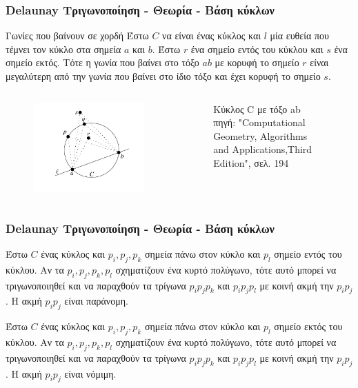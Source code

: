 \documentclass[xcolor=dvipsnames, 11pt]{beamer}
\newcommand{\en}{\selectlanguage{english}}
\newcommand{\el}{\selectlanguage{greek}}
\begin{document}
\begin{frame}
	\frametitle{\en Delaunay \el Τριγωνοποίηση - Θεωρία - Βάση κύκλων}
	\begin{mytheorem}{Γωνίες που βαίνουν σε χορδή}{}
		Έστω \(C\) να είναι ένας κύκλος και \(l\) μία ευθεία που τέμνει τον κύκλο στα σημεία \(a\) και \(b\). Έστω \(r\) ένα σημείο εντός του κύκλου και \(s\) ένα σημείο εκτός. Τότε η γωνία που βαίνει στο τόξο \(ab\) με κορυφή το σημείο \(r\) είναι μεγαλύτερη από την γωνία που βαίνει στο ίδιο τόξο και έχει κορυφή το σημείο \(s\). 
	\end{mytheorem}
	\begin{columns}
		\begin{figure}
			\includegraphics[scale=0.25]{images/circle.png}
		\end{figure}
		\begin{figure}
			\caption{Κύκλος C με τόξο ab \\ πηγή: "Computational Geometry, Algorithms and Applications,Third Edition", σελ. 194}
		\end{figure}
	\end{columns}
\end{frame}

\begin{frame}
	\frametitle{\en Delaunay \el Τριγωνοποίηση - Θεωρία - Βάση κύκλων}
	\begin{mylemma}{}{}
		Έστω \(C\) ένας κύκλος και \(p_i, p_j, p_k\) σημεία πάνω στον κύκλο και \(p_l\) σημείο εντός του κύκλου. Αν τα \(p_i, p_j, p_k, p_l\) σχηματίζουν ένα κυρτό πολύγωνο, τότε αυτό μπορεί να τριγωνοποιηθεί και να παραχθούν τα τρίγωνα \(p_i p_j p_k\) και \(p_i p_j p_l\) με κοινή ακμή την \(p_i p_j\). Η ακμή \(p_i p_j\) είναι παράνομη.
	\end{mylemma} 	
	\begin{mylemma}{}{}
		Έστω \(C\) ένας κύκλος και \(p_i, p_j, p_k\) σημεία πάνω στον κύκλο και \(p_l\) σημείο εκτός του κύκλου. Αν τα \(p_i, p_j, p_k, p_l\) σχηματίζουν ένα κυρτό πολύγωνο, τότε αυτό μπορεί να τριγωνοποιηθεί και να παραχθούν τα τρίγωνα \(p_i p_j p_k\) και \(p_i p_j p_l\) με κοινή ακμή την \(p_i p_j\). Η ακμή \(p_i p_j\) είναι νόμιμη.
	\end{mylemma} 
\end{frame}
\end{document}
